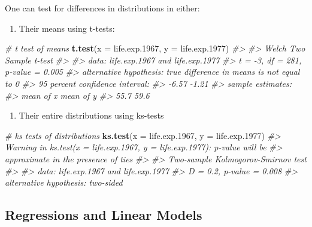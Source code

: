 \documentclass[]{book}
\newenvironment{Shaded}{\begin{snugshade}}{\end{snugshade}}
\newcommand{\CommentTok}[1]{\textcolor[rgb]{0.56,0.35,0.01}{\textit{#1}}}
\newcommand{\DataTypeTok}[1]{\textcolor[rgb]{0.13,0.29,0.53}{#1}}
\newcommand{\FloatTok}[1]{\textcolor[rgb]{0.00,0.00,0.81}{#1}}
\newcommand{\KeywordTok}[1]{\textcolor[rgb]{0.13,0.29,0.53}{\textbf{#1}}}
\newcommand{\NormalTok}[1]{#1}
\providecommand{\tightlist}{%
  \setlength{\itemsep}{0pt}\setlength{\parskip}{0pt}}
\begin{document}
One can test for differences in distributions in either:

\begin{enumerate}
\def\labelenumi{\arabic{enumi})}
\tightlist
\item
  Their means using t-tests:
\end{enumerate}

\begin{Shaded}
\begin{Highlighting}[]
\CommentTok{# t test of means}
\KeywordTok{t.test}\NormalTok{(}\DataTypeTok{x =}\NormalTok{ life.exp}\FloatTok{.1967}\NormalTok{, }\DataTypeTok{y =}\NormalTok{ life.exp}\FloatTok{.1977}\NormalTok{)}
\CommentTok{#> }
\CommentTok{#>  Welch Two Sample t-test}
\CommentTok{#> }
\CommentTok{#> data:  life.exp.1967 and life.exp.1977}
\CommentTok{#> t = -3, df = 281, p-value = 0.005}
\CommentTok{#> alternative hypothesis: true difference in means is not equal to 0}
\CommentTok{#> 95 percent confidence interval:}
\CommentTok{#>  -6.57 -1.21}
\CommentTok{#> sample estimates:}
\CommentTok{#> mean of x mean of y }
\CommentTok{#>      55.7      59.6}
\end{Highlighting}
\end{Shaded}

\begin{enumerate}
\def\labelenumi{\arabic{enumi})}
\setcounter{enumi}{1}
\tightlist
\item
  Their entire distributions using ks-tests
\end{enumerate}

\begin{Shaded}
\begin{Highlighting}[]
\CommentTok{# ks tests of distributions}
\KeywordTok{ks.test}\NormalTok{(}\DataTypeTok{x =}\NormalTok{ life.exp}\FloatTok{.1967}\NormalTok{, }\DataTypeTok{y =}\NormalTok{ life.exp}\FloatTok{.1977}\NormalTok{)}
\CommentTok{#> Warning in ks.test(x = life.exp.1967, y = life.exp.1977): p-value will be}
\CommentTok{#> approximate in the presence of ties}
\CommentTok{#> }
\CommentTok{#>  Two-sample Kolmogorov-Smirnov test}
\CommentTok{#> }
\CommentTok{#> data:  life.exp.1967 and life.exp.1977}
\CommentTok{#> D = 0.2, p-value = 0.008}
\CommentTok{#> alternative hypothesis: two-sided}
\end{Highlighting}
\end{Shaded}

\hypertarget{regressions-and-linear-models}{%
\subsection{Regressions and Linear Models}\label{regressions-and-linear-models}}
\end{document}
